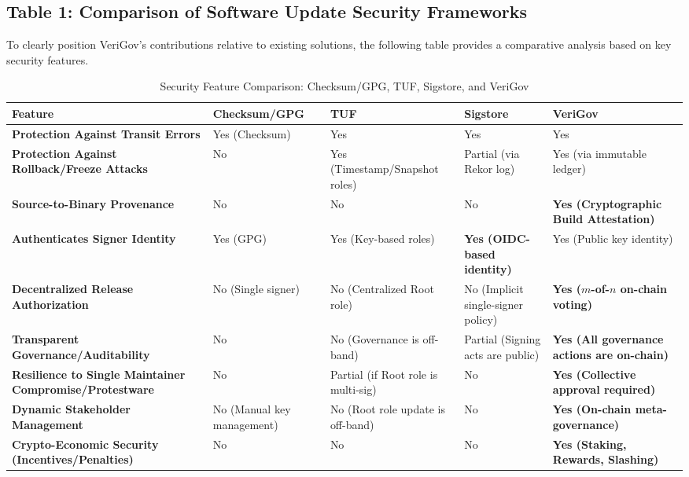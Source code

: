\documentclass{article}
\begin{document}
\subsection{Table 1: Comparison of Software Update Security Frameworks}

To clearly position VeriGov's contributions relative to existing solutions, the following table provides a comparative analysis based on key security features.

\begin{table}[H]
    \centering
    \caption{Security Feature Comparison: Checksum/GPG, TUF, Sigstore, and VeriGov}
    \label{tab:security_comparison}
    \small %
    \begin{tabularx}{\textwidth}{>{\bfseries}L L L L L}
        \toprule
        \textbf{Feature} & \textbf{Checksum/GPG} & \textbf{TUF} & \textbf{Sigstore} & \textbf{VeriGov} \\
        \midrule
        Protection Against Transit Errors & Yes (Checksum) & Yes & Yes & Yes \\
        \addlinespace
        Protection Against Rollback/Freeze Attacks & No & Yes (Timestamp/Snapshot roles) & Partial (via Rekor log) & Yes (via immutable ledger) \\
        \addlinespace
        Source-to-Binary Provenance & No & No & No & \textbf{Yes (Cryptographic Build Attestation)} \\
        \addlinespace
        Authenticates Signer Identity & Yes (GPG) & Yes (Key-based roles) & \textbf{Yes (OIDC-based identity)} & Yes (Public key identity) \\
        \addlinespace
        Decentralized Release Authorization & No (Single signer) & No (Centralized Root role) & No (Implicit single-signer policy) & \textbf{Yes ($m$-of-$n$ on-chain voting)} \\
        \addlinespace
        Transparent Governance/Auditability & No & No (Governance is off-band) & Partial (Signing acts are public) & \textbf{Yes (All governance actions are on-chain)} \\
        \addlinespace
        Resilience to Single Maintainer Compromise/Protestware & No & Partial (if Root role is multi-sig) & No & \textbf{Yes (Collective approval required)} \\
        \addlinespace
        Dynamic Stakeholder Management & No (Manual key management) & No (Root role update is off-band) & No & \textbf{Yes (On-chain meta-governance)} \\
        \addlinespace
        Crypto-Economic Security (Incentives/Penalties) & No & No & No & \textbf{Yes (Staking, Rewards, Slashing)} \\
        \bottomrule
    \end{tabularx}
\end{table}
\end{document}
